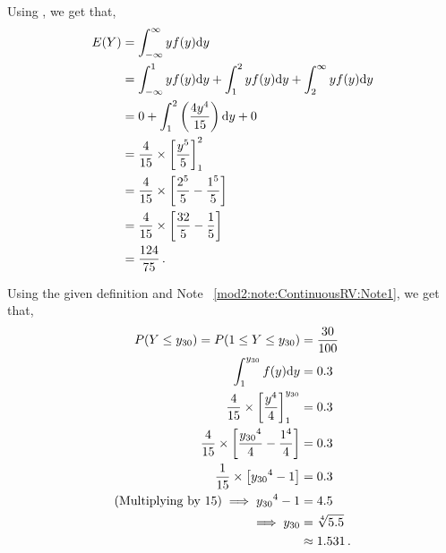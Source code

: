 \begin{subquestions}
\begin{subsubquestions}

\subquestion

Using , we get that,
\begin{align}
	E(Y) & = \int_{-\infty}^{\infty}y f(y)\mathrm{d}y \nonumber \\
	     & = \int_{-\infty}^{1}y f(y)\mathrm{d}y + \int_{1}^{2}y f(y)\mathrm{d}y + \int_{2}^{\infty}y f(y)\mathrm{d}y \nonumber \\
	     & = 0 + \int_{1}^{2} \left( \frac{4y^4}{15}\right)\mathrm{d}y + 0 \nonumber \\
	     & = \frac{4}{15} \times \left[\frac{y^5}{5} \right]^2_1 \nonumber \\
	     & = \frac{4}{15} \times \left[\frac{2^5}{5} -\frac{1^5}{5} \right] \nonumber \\
	     & = \frac{4}{15} \times \left[\frac{32}{5} -\frac{1}{5} \right] \nonumber \\
	     & = \frac{124}{75} \,. 
\end{align}


\subquestion

Using the given definition and Note ~\ref{mod2:note:ContinuousRV:Note1}, we get that,
\begin{align}
	P(Y \leq y_{30}) = P(1 \leq Y \leq y_{30}) & = \frac{30}{100} \nonumber \\
	                   \int_{1}^{y_{30}} f(y)\mathrm{d}y & = 0.3 \nonumber \\
	                   \frac{4}{15} \times \left[\frac{y^4}{4}\right]^{{y_{30}}}_1 & = 0.3 \nonumber \\
	                   \frac{4}{15} \times \left[\frac{{y_{30}}^4}{4} - \frac{1^4}{4}\right] & = 0.3 \nonumber \\
	                   \frac{1}{15} \times \left[{y_{30}}^4 - 1\right] & = 0.3 \nonumber \\                   
	     \text{(Multiplying by 15)} \implies {y_{30}}^4 -1 & = 4.5 \nonumber \\
	                   \implies {y_{30}} & = \sqrt[4]{5.5} \nonumber \\
	                                     & \approx 1.531 \,.             
\end{align}

\end{subsubquestions}
	
\end{subquestions}


